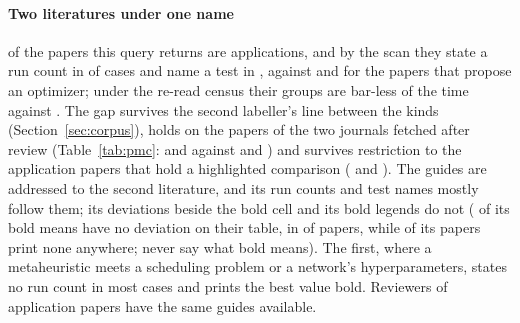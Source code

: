 \documentclass[preprint,review,12pt]{elsarticle}
\begin{document}
\paragraph{Two literatures under one name} \nKcApplication{} of the \nSkAllPapers{} papers this query returns are applications, and by the scan they state a run count in \nSkApplicationPctRunsStated{} of cases and name a test in \nSkApplicationPctTestNamed{}, against \nSkNewOptimizerPctRunsStated{} and \nSkNewOptimizerPctTestNamed{} for the papers that propose an optimizer; under the re-read census their groups are bar-less \nCrcApplicationNeither{} of the time against \nCrcNewOptimizerNeither{}. The gap survives the second labeller's line between the kinds (Section~\ref{sec:corpus}), holds on the \nPmScanned{} papers of the two journals fetched after review (Table~\ref{tab:pmc}: \nPmSkNewOptimizerPctRunsStated{} and \nPmSkNewOptimizerPctTestNamed{} against \nPmSkApplicationPctRunsStated{} and \nPmSkApplicationPctTestNamed{}) and survives restriction to the application papers that hold a highlighted comparison (\nHkApplicationPctRunsStated{} and \nHkApplicationPctTestNamed{}). The guides are addressed to the second literature, and its run counts and test names mostly follow them; its deviations beside the bold cell and its bold legends do not (\nCrcMeansNewOptimizerNeither{} of its bold means have no deviation on their table, in \nCrcPbNewOptimizerPapersWithHits{} of \nCrcPbNewOptimizerPapers{} papers, while \nTrNewOptimizerLayoutNonePct{} of its papers print none anywhere; \nTrNewOptimizerBoldNotStatedPct{} never say what bold means). The first, where a metaheuristic meets a scheduling problem or a network's hyperparameters, states no run count in most cases and prints the best value bold. Reviewers of application papers have the same guides available.
\end{document}
